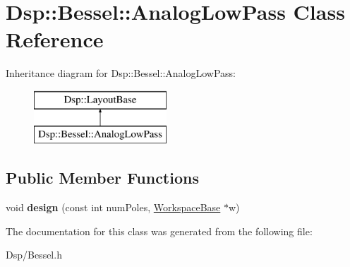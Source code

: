 \hypertarget{classDsp_1_1Bessel_1_1AnalogLowPass}{\section{Dsp\-:\-:Bessel\-:\-:Analog\-Low\-Pass Class Reference}
\label{classDsp_1_1Bessel_1_1AnalogLowPass}
}
Inheritance diagram for Dsp\-:\-:Bessel\-:\-:Analog\-Low\-Pass\-:\begin{figure}[H]
\begin{center}
\leavevmode
\includegraphics[height=2.000000cm]{classDsp_1_1Bessel_1_1AnalogLowPass}
\end{center}
\end{figure}
\subsection*{Public Member Functions}
\begin{DoxyCompactItemize}
\item 
\hypertarget{classDsp_1_1Bessel_1_1AnalogLowPass_a79ab8e107268cbb3b8be195a225ce30f}{void {\bfseries design} (const int num\-Poles, \hyperlink{structDsp_1_1Bessel_1_1WorkspaceBase}{Workspace\-Base} $\ast$w)}\label{classDsp_1_1Bessel_1_1AnalogLowPass_a79ab8e107268cbb3b8be195a225ce30f}

\end{DoxyCompactItemize}


The documentation for this class was generated from the following file\-:\begin{DoxyCompactItemize}
\item 
Dsp/Bessel.\-h\end{DoxyCompactItemize}
